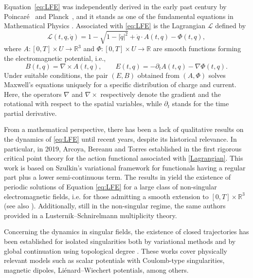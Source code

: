 \documentclass{article}
\newcommand{\boL}{\mathcal{L}}
\newcommand{\R}{\mathbb{R}}
\newcommand{\dq}{\dot{q}}
\theoremstyle{definition}
\begin{document}
Equation~\eqref{eq:LFE} was independently derived in the early past century by Poincaré~\cite{Po2} and Planck~\cite{Planck}, and it stands as one of the fundamental equations in Mathematical Physics \cite{Gri, Jac}. Associated with \eqref{eq:LFE} is the Lagrangian $\boL$ defined by
\begin{equation}\label{Lagrangian}
	\boL(t,q,\dq) = 1 - \sqrt{1 - |\dq|^2} + \dq\cdot A(t,q) -\Phi(t,q),
\end{equation}
where $A:[0,T]\times U\to\R^3$ and $\Phi:[0,T]\times U\to\R$ are smooth functions forming the electromagnetic potential, i.e.,
\begin{equation}\label{Potential-Fields}
B(t,q)=\nabla\times A (t,q),\qquad E(t,q)=-\partial_t A(t,q)-\nabla\Phi(t,q).
\end{equation}
Under suitable conditions, the pair $(E,B)$ obtained from $(A,\Phi)$ solves Maxwell's equations uniquely for a specific distribution of charge and current. Here, the operators $\nabla$ and $\nabla\times$ respectively denote the gradient and the rotational with respect to the spatial variables, while $\partial_t$ stands for the time partial derivative.

From a mathematical perspective, there has been a lack of qualitative results on the dynamics of \eqref{eq:LFE} until recent years, despite its historical relevance. In particular, in 2019, Arcoya, Bereanu and Torres established in \cite{ABT} the first rigorous critical point theory for the action functional associated with \eqref{Lagrangian}. This work is based on Szulkin's variational framework \cite{Szu} for functionals having a regular part plus a lower semi-continuous term. The results in \cite{ABT} yield the existence of periodic solutions of Equation \eqref{eq:LFE} for a large class of non-singular electromagnetic fields, i.e. for those admitting a smooth extension to $[0,T]\times \R^3$ (see also \cite{Ber2}). Additionally, still in the non-singular regime, the same authors provided in \cite{ABT2} a Lusternik--Schnirelmann multiplicity theory.

Concerning the dynamics in singular fields, the existence of closed trajectories has been established for isolated singularities both by variational methods \cite{AS,Ber1,BosDamPap} and by global continuation using topological degree \cite{GT}. These works cover physically relevant models such as scalar potentials with Coulomb-type singularities, magnetic dipoles, Liénard--Wiechert potentials, among others.
\end{document}
